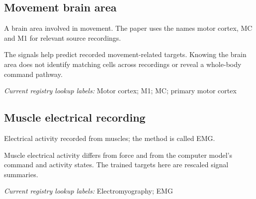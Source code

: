 \begin{samepage}
\subsection*{Movement brain area}
\noindent A brain area involved in movement. The paper uses the names motor cortex, MC and M1 for relevant source recordings.\par
\end{samepage}
\begin{samepage}
\noindent The signals help predict recorded movement-related targets. Knowing the brain area does not identify matching cells across recordings or reveal a whole-body command pathway.\par\nopagebreak[4]

\end{samepage}


\noindent\textit{Current registry lookup labels:} Motor cortex; M1; MC; primary motor cortex\par

\begin{samepage}
\subsection*{Muscle electrical recording}
\noindent Electrical activity recorded from muscles; the method is called EMG.\par
\end{samepage}
\begin{samepage}
\noindent Muscle electrical activity differs from force and from the computer model’s command and activity states. The trained targets here are rescaled signal summaries.\par\nopagebreak[4]

\end{samepage}


\noindent\textit{Current registry lookup labels:} Electromyography; EMG\par

